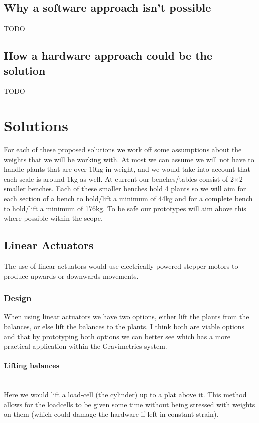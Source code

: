 \documentclass[11pt]{article}
\begin{document}
\subsection{Why a software approach isn't possible}
TODO
\subsection{How a hardware approach could be the solution}
TODO

\section{Solutions}
For each of these proposed solutions we work off some assumptions about the weights that we will be working with.
At most we can assume we will not have to handle plants that are over 10kg in weight, and we would take into account that
each scale is around 1kg as well. At current our benches/tables consist of 2$\times$2 smaller benches.
Each of these smaller benches hold 4 plants so we will aim for each section of a bench to hold/lift a minimum of 44kg and for a complete bench to hold/lift a minimum of 176kg. To be safe our prototypes will aim above this where possible within the scope.

\subsection{Linear Actuators}
The use of linear actuators would use electrically powered stepper motors to produce upwards or
downwards movements. 
\subsubsection{Design}
When using linear actuators we have two options, either lift the plants from the balances, or else lift the balances to the
plants. I think both are viable options and that by prototyping both options we can better see which has a more practical
application within the Gravimetrics system. 

\paragraph{Lifting balances}\mbox{}\\
Here we would lift a load-cell (the cylinder) up to a plat above it. This method allows for the loadcells
to be given some time without being stressed with weights on them (which could damage the hardware if left in constant strain). 
\end{document}
